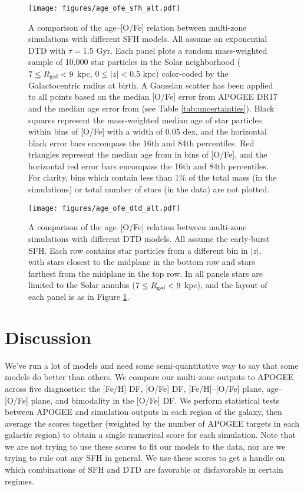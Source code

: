 \documentclass[modern,linenumbers]{aastex631}
\begin{document}
\begin{figure}
    \centering
    \texttt{[image: figures/age\_ofe\_sfh\_alt.pdf]}
    \caption{A comparison of the age--[O/Fe] relation between multi-zone simulations with different SFH models. All assume an exponential DTD with $\tau=1.5$ Gyr. Each panel plots a random mass-weighted sample of 10,000 star particles in the Solar neighborhood ($7\leq R_{\rm gal}<9$ kpc, $0\leq|z|<0.5$ kpc) color-coded by the Galactocentric radius at birth. A Gaussian scatter has been applied to all points based on the median [O/Fe] error from APOGEE DR17 and the median age error from \citet{Leung2023-Ages} (see Table \ref{tab:uncertainties}). Black squares represent the mass-weighted median age of star particles within bins of [O/Fe] with a width of 0.05 dex, and the horizontal black error bars encompass the 16th and 84th percentiles. Red triangles represent the median age from \citet{Leung2023-Ages} in bins of [O/Fe], and the horizontal red error bars encompass the 16th and 84th percentiles. For clarity, bins which contain less than 1\% of the total mass (in the simulations) or total number of stars (in the data) are not plotted.}
    \label{fig:age-ofe-sfh}
\end{figure}

\begin{figure*}
    \centering
    \texttt{[image: figures/age\_ofe\_dtd\_alt.pdf]}
    \caption{A comparison of the age--[O/Fe] relation between multi-zone simulations with different DTD models. All assume the early-burst SFH. Each row contains star particles from a different bin in $|z|$, with stars closest to the midplane in the bottom row and stars farthest from the midplane in the top row. In all panels stars are limited to the Solar annulus ($7\leq R_{\rm gal}<9$ kpc), and the layout of each panel is as in Figure \ref{fig:age-ofe-sfh}.}
    \label{fig:age-ofe-dtd}
\end{figure*}


\section{Discussion}
\label{sec:discussion}

We've run a lot of models and need some semi-quantitative way to say that some models do better than others. We compare our multi-zone outputs to APOGEE across five diagnostics: the [Fe/H] DF, [O/Fe] DF, [Fe/H]--[O/Fe] plane, age--[O/Fe] plane, and bimodality in the [O/Fe] DF. We perform statistical tests between APOGEE and simulation outputs in each region of the galaxy, then average the scores together (weighted by the number of APOGEE targets in each galactic region) to obtain a single numerical score for each simulation. Note that we are not trying to use these scores to fit our models to the data, nor are we trying to rule out any SFH in general. We use these scores to get a handle on which combinations of SFH and DTD are favorable or disfavorable in certain regimes. 
\end{document}
